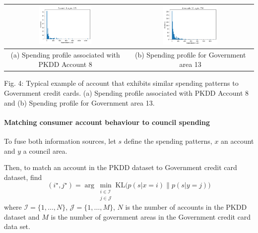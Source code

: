 \documentclass[]{article}
\begin{document}
\begin{longtable}[]{@{}cc@{}}
\toprule
\includegraphics[width=0.45\textwidth]{uploads/upload_45a990d0df922f46b8f78f6bbd3de299.png} &
\includegraphics[width=0.45\textwidth]{uploads/upload_65a0e8bbc1a7c9e48a5c07f53fade04c.png}\tabularnewline
\midrule
\endhead
(a) Spending profile associated with PKDD Account 8 & (b) Spending profile for Government area 13\tabularnewline
\bottomrule
\end{longtable}



Fig. 4: Typical example of account that exhibits similar spending
patterns to Government credit cards. (a) Spending profile associated
with PKDD Account 8 and (b) Spending profile for Government area 13.

\paragraph{Matching consumer account behaviour to council
spending}\label{matching-consumer-account-behaviour-to-council-spending}

To fuse both information sources, let \(s\) define the spending
patterns, \(x\) an account and \(y\) a council area.

Then, to match an account in the PKDD dataset to Government credit card
dataset, find \[
(i^{\star}, j^{\star}) = \arg\min_{\substack{i\in \mathcal{I}\\ j\in \mathcal{J}}} \mathrm{KL}
    \big(
        p(s|x=i) \big\| p(s|y=j)
    \big)
\] where \(\mathcal{I}=\{1,\ldots,N\}\), \(\mathcal{J}=\{1,\ldots,M\}\),
\(N\) is the number of accounts in the PKDD dataset and \(M\) is the
number of government areas in the Government credit card data set.
\end{document}
